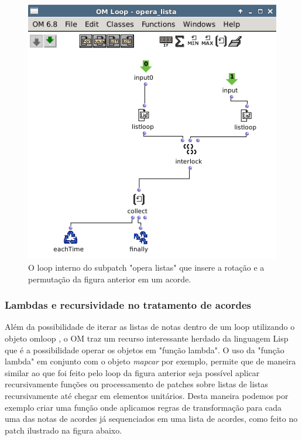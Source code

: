 \documentclass[
	12pt,				%
	openright,			%
	twoside,			%
	a4paper,			%
	english,			%
	french,				%
	spanish,			%
	brazil				%
	]{abntex2}
\begin{document}
\begin{figure}[!h]
	\caption{\label{fig_grafico}O loop interno do subpatch "opera listas" que insere a rotação e a permutação da figura anterior em um acorde. }
	\begin{center}
	    \includegraphics[scale=0.5]{OMPD/opera_listas.png}
	\end{center}
\end{figure}


\subsubsection{Lambdas e recursividade no tratamento de acordes}

Além da possibilidade de iterar as listas de notas dentro de um loop utilizando o objeto omloop , o OM traz um recurso interessante herdado da linguagem Lisp que é a possibilidade operar os objetos em "função lambda". O uso da "função lambda" em conjunto com o objeto \textit{mapcar} por exemplo, permite que de maneira similar ao que foi feito pelo loop da figura anterior seja possível aplicar recursivamente funções ou processamento de patches sobre listas de listas recursivamente até chegar em elementos unitários. Desta maneira podemos por exemplo criar uma função onde aplicamos regras de transformação para cada uma das notas de acordes já sequenciados em uma lista de acordes, como feito no patch ilustrado na figura abaixo.
\end{document}
